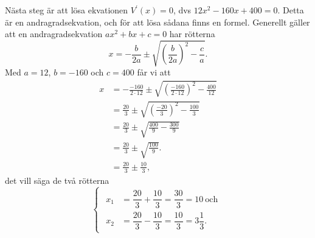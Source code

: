 \documentclass[a4paper,12pt]{article}
\begin{document}
Nästa steg är att lösa ekvationen 
  $V^\prime(x) = 0$, dvs $12x^2 - 160x + 400 = 0$. 
Detta är en andragradsekvation, och för att lösa sådana
finns en formel. Generellt gäller att en andragradsekvation
  $ax^2 + bx + c = 0$ 
har rötterna 
%
\begin{displaymath}
  x = -\frac{b}{2a}
      \pm
      \sqrt{\left(\frac{b}{2a}\right)^2 - \frac{c}{a}}.
\end{displaymath}
%
Med $a = 12$, $b = -160$ och $c = 400$ får vi att
%
\begin{align*}
  x &= -\frac{-160}{2 \cdot 12}
       \pm
       \sqrt{\left(\frac{-160}{2 \cdot 12}\right)^2 - \frac{400}{12}} \\
    &= \frac{20}{3}
       \pm
       \sqrt{\left(\frac{-20}{3}\right)^2 - \frac{100}{3}} \\
    &= \frac{20}{3}
       \pm
       \sqrt{\frac{400}{9} - \frac{300}{9}} \\
    &= \frac{20}{3}
       \pm
       \sqrt{\frac{100}{9}}. \\
    &= \frac{20}{3}
       \pm
       \frac{10}{3},
\end{align*}
% 
det vill säga de två rötterna
%
\begin{displaymath}
  \begin{cases}
    \begin{aligned}
      x_1 &= \dfrac{20}{3} + \dfrac{10}{3}
           = \dfrac{3 0}{3}
           = 10~\text{och}\\
      x_2 &= \dfrac{20}{3} - \dfrac{10}{3}
           = \dfrac{10}{3}
           = 3\dfrac{1}{3}.
    \end{aligned}
  \end{cases}
\end{displaymath}
\end{document}
